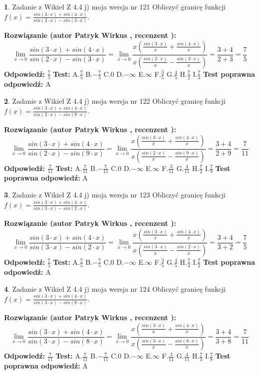 \documentclass[12pt, a4paper]{article}
\theoremstyle{definition} %
\newtheorem{zad}{}
\newcommand{\zadStart}[1]{\begin{zad}#1\newline}
\newcommand{\zadStop}{\end{zad}}
\newcommand{\rozwStart}[2]{\noindent \textbf{Rozwiązanie (autor #1 , recenzent #2): }\newline}
\newcommand{\rozwStop}{\newline}
\newcommand{\odpStart}{\noindent \textbf{Odpowiedź:}\newline}
\newcommand{\odpStop}{\newline}
\newcommand{\testStart}{\noindent \textbf{Test:}\newline}
\newcommand{\testStop}{\newline}
\newcommand{\kluczStart}{\noindent \textbf{Test poprawna odpowiedź:}\newline}
\newcommand{\kluczStop}{\newline}
\begin{document}
\zadStart{Zadanie z Wikieł Z 4.4 j) moja wersja nr 121}
Obliczyć granicę funkcji $f(x)=\frac{sin(3\cdot x) +sin(4\cdot x)}{sin(2\cdot x) -sin(3\cdot x)}$.
\zadStop
\rozwStart{Patryk Wirkus}{}
$$\lim\limits_{x\to 0}\frac{sin(3\cdot x) +sin(4\cdot x)}{sin(2\cdot x) -sin(3\cdot x)}=\lim\limits_{x\to 0}\frac{x(\frac{sin(3\cdot x)}{x}+\frac{sin(4\cdot x)}{x})}{x(\frac{sin(2\cdot x)}{x}-\frac{sin(3\cdot x)}{x})}=\frac{3+4}{2+3} = \frac{7}{5}$$
\rozwStop
\odpStart
$\frac{7}{5}$
\odpStop
\testStart
A.$\frac{7}{5}$
B.$-\frac{7}{5}$
C.$0$
D.$-\infty$
E.$\infty$
F.$\frac{3}{5}$
G.$\frac{4}{5}$
H.$\frac{7}{2}$
I.$\frac{7}{3}$
\testStop
\kluczStart
A
\kluczStop



\zadStart{Zadanie z Wikieł Z 4.4 j) moja wersja nr 122}
Obliczyć granicę funkcji $f(x)=\frac{sin(3\cdot x) +sin(4\cdot x)}{sin(2\cdot x) -sin(9\cdot x)}$.
\zadStop
\rozwStart{Patryk Wirkus}{}
$$\lim\limits_{x\to 0}\frac{sin(3\cdot x) +sin(4\cdot x)}{sin(2\cdot x) -sin(9\cdot x)}=\lim\limits_{x\to 0}\frac{x(\frac{sin(3\cdot x)}{x}+\frac{sin(4\cdot x)}{x})}{x(\frac{sin(2\cdot x)}{x}-\frac{sin(9\cdot x)}{x})}=\frac{3+4}{2+9} = \frac{7}{11}$$
\rozwStop
\odpStart
$\frac{7}{11}$
\odpStop
\testStart
A.$\frac{7}{11}$
B.$-\frac{7}{11}$
C.$0$
D.$-\infty$
E.$\infty$
F.$\frac{3}{11}$
G.$\frac{4}{11}$
H.$\frac{7}{2}$
I.$\frac{7}{9}$
\testStop
\kluczStart
A
\kluczStop



\zadStart{Zadanie z Wikieł Z 4.4 j) moja wersja nr 123}
Obliczyć granicę funkcji $f(x)=\frac{sin(3\cdot x) +sin(4\cdot x)}{sin(3\cdot x) -sin(2\cdot x)}$.
\zadStop
\rozwStart{Patryk Wirkus}{}
$$\lim\limits_{x\to 0}\frac{sin(3\cdot x) +sin(4\cdot x)}{sin(3\cdot x) -sin(2\cdot x)}=\lim\limits_{x\to 0}\frac{x(\frac{sin(3\cdot x)}{x}+\frac{sin(4\cdot x)}{x})}{x(\frac{sin(3\cdot x)}{x}-\frac{sin(2\cdot x)}{x})}=\frac{3+4}{3+2} = \frac{7}{5}$$
\rozwStop
\odpStart
$\frac{7}{5}$
\odpStop
\testStart
A.$\frac{7}{5}$
B.$-\frac{7}{5}$
C.$0$
D.$-\infty$
E.$\infty$
F.$\frac{3}{5}$
G.$\frac{4}{5}$
H.$\frac{7}{3}$
I.$\frac{7}{2}$
\testStop
\kluczStart
A
\kluczStop



\zadStart{Zadanie z Wikieł Z 4.4 j) moja wersja nr 124}
Obliczyć granicę funkcji $f(x)=\frac{sin(3\cdot x) +sin(4\cdot x)}{sin(3\cdot x) -sin(8\cdot x)}$.
\zadStop
\rozwStart{Patryk Wirkus}{}
$$\lim\limits_{x\to 0}\frac{sin(3\cdot x) +sin(4\cdot x)}{sin(3\cdot x) -sin(8\cdot x)}=\lim\limits_{x\to 0}\frac{x(\frac{sin(3\cdot x)}{x}+\frac{sin(4\cdot x)}{x})}{x(\frac{sin(3\cdot x)}{x}-\frac{sin(8\cdot x)}{x})}=\frac{3+4}{3+8} = \frac{7}{11}$$
\rozwStop
\odpStart
$\frac{7}{11}$
\odpStop
\testStart
A.$\frac{7}{11}$
B.$-\frac{7}{11}$
C.$0$
D.$-\infty$
E.$\infty$
F.$\frac{3}{11}$
G.$\frac{4}{11}$
H.$\frac{7}{3}$
I.$\frac{7}{8}$
\testStop
\kluczStart
A
\kluczStop
\end{document}

